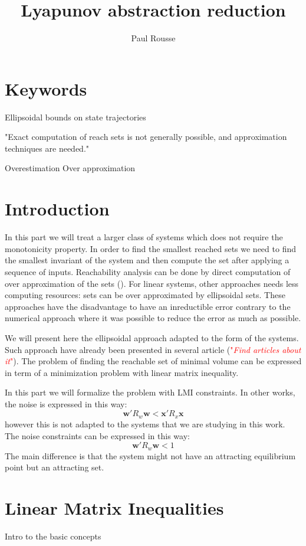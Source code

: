\documentclass{article}
\theoremstyle{named}
\newcommand{\vect}[1]{\ensuremath{ \mathbf{#1}}}
\newcommand\comment[1]{\textcolor{red}{"\textit{#1}"}}
\begin{document}
\title{Lyapunov abstraction reduction}
\author{Paul Rousse}

\maketitle

\section*{Keywords}

Ellipsoidal bounds on state trajectories

"Exact computation of reach sets is not generally possible, and approximation techniques are needed."

Overestimation
Over approximation

\section{Introduction}
In this part we will treat a larger class of systems which does not require the monotonicity property.
In order to find the smallest reached sets we need to find the smallest invariant of the system and then compute the set after applying a sequence of inputs.
Reachability analysis can be done by direct computation of over approximation of the sets (\cite{reissig2011computing}). For linear systems, other approaches needs less computing resources: sets can be over approximated by ellipsoidal sets. These approaches have the disadvantage to have an inreductible error contrary to the numerical approach where it was possible to reduce the error as much as possible.

We will present here the ellipsoidal approach adapted to the form of the systems.
Such approach have already been presented in several article (\comment{Find articles about it}).
The problem of finding the reachable set of minimal volume can be expressed in term of a minimization problem with linear matrix inequality.

In this part we will formalize the problem with LMI constraints.
In other works, the noise is expressed in this way:
$$
\vect{w}' R_w \vect{w} < \vect{x}' R_x \vect{x}
$$
however this is not adapted to the systems that we are studying in this work.
The noise constraints can be expressed in this way:
$$
\vect{w}' R_w \vect{w} < 1
$$
The main difference is that the system might not have an attracting equilibrium point but an attracting set.

\section{Linear Matrix Inequalities}
Intro to the basic concepts
\end{document}
